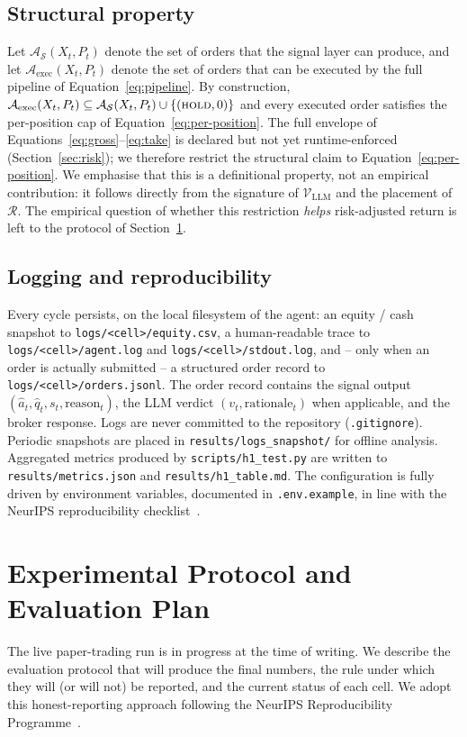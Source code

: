 \documentclass{article}
\begin{document}
\subsection{Structural property}
\label{sec:structural}
Let $\mathcal{A}_{\mathcal{S}}(X_t, P_t)$ denote the set of orders that the signal layer can produce, and let $\mathcal{A}_{\text{exec}}(X_t, P_t)$ denote the set of orders that can be executed by the full pipeline of Equation~\eqref{eq:pipeline}. By construction, $\mathcal{A}_{\text{exec}}(X_t, P_t) \subseteq \mathcal{A}_{\mathcal{S}}(X_t, P_t) \cup \{(\textsc{hold}, 0)\}$ and every executed order satisfies the per-position cap of Equation~\eqref{eq:per-position}. The full envelope of Equations~\eqref{eq:gross}--\eqref{eq:take} is declared but not yet runtime-enforced (Section~\ref{sec:risk}); we therefore restrict the structural claim to Equation~\eqref{eq:per-position}. We emphasise that this is a definitional property, not an empirical contribution: it follows directly from the signature of $\mathcal{V}_{\text{LLM}}$ and the placement of $\mathcal{R}$. The empirical question of whether this restriction \emph{helps} risk-adjusted return is left to the protocol of Section~\ref{sec:protocol}.

\subsection{Logging and reproducibility}
Every cycle persists, on the local filesystem of the agent: an equity / cash snapshot to \texttt{logs/<cell>/equity.csv}, a human-readable trace to \texttt{logs/<cell>/agent.log} and \texttt{logs/<cell>/stdout.log}, and -- only when an order is actually submitted -- a structured order record to \texttt{logs/<cell>/orders.jsonl}. The order record contains the signal output $(\hat{a}_t, \hat{q}_t, s_t, \text{reason}_t)$, the LLM verdict $(v_t, \text{rationale}_t)$ when applicable, and the broker response. Logs are never committed to the repository (\texttt{.gitignore}). Periodic snapshots are placed in \texttt{results/logs\_snapshot/} for offline analysis. Aggregated metrics produced by \texttt{scripts/h1\_test.py} are written to \texttt{results/metrics.json} and \texttt{results/h1\_table.md}. The configuration is fully driven by environment variables, documented in \texttt{.env.example}, in line with the NeurIPS reproducibility checklist~\cite{pineau_reproducibility2020}.

\section{Experimental Protocol and Evaluation Plan}
\label{sec:protocol}
The live paper-trading run is in progress at the time of writing. We describe the evaluation protocol that will produce the final numbers, the rule under which they will (or will not) be reported, and the current status of each cell. We adopt this honest-reporting approach following the NeurIPS Reproducibility Programme~\cite{pineau_reproducibility2020}.
\end{document}
